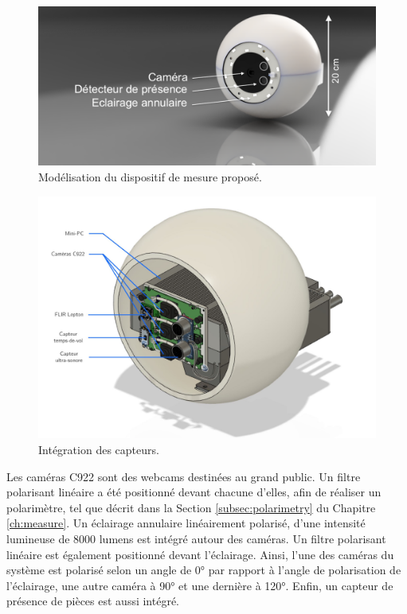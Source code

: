 \begin{figure}[thbp]
	\centering
	\includegraphics[width=\textwidth,height=\textheight,keepaspectratio]{../Chap5/Figures/Rendu_TE-1_2019-Jan-23_06-00-31PM_withText.png}
	\caption{Modélisation du dispositif de mesure proposé.}
	\label{fig:design}
\end{figure}

\begin{figure}[hbtp]
	\centering
	\includegraphics[width=\textwidth,height=\textheight,keepaspectratio]{../Chap5/Figures/Capture-2019-11-05-11-59-31-copie.jpg}
	\caption{Intégration des capteurs.}
	\label{fig:integration}
\end{figure}

Les caméras C922 sont des webcams destinées au grand public.
Un filtre polarisant linéaire a été positionné devant chacune d'elles, afin de réaliser un polarimètre, tel que décrit dans la Section \ref{subsec:polarimetry} du Chapitre \ref{ch:measure}.
Un éclairage annulaire linéairement polarisé, d'une intensité lumineuse de 8000 lumens est intégré autour des caméras.
Un filtre polarisant linéaire est également positionné devant l'éclairage.
Ainsi, l'une des caméras du système est polarisé selon un angle de 0° par rapport à l'angle de polarisation de l'éclairage, une autre caméra à 90° et une dernière à 120°.
Enfin, un capteur de présence de pièces est aussi intégré.

